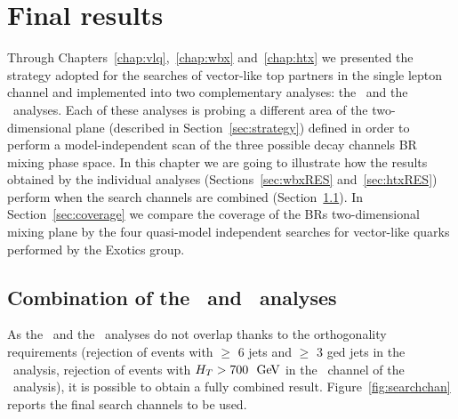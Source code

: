 \clearpage{\pagestyle{empty}\cleardoublepage}

\chapter{Final results}\label{chap:results}

Through Chapters~\ref{chap:vlq},~\ref{chap:wbx} and~\ref{chap:htx}
we presented the strategy adopted for the searches of vector-like
top partners in the single lepton channel and implemented into
two complementary analyses: the \wbx\ and the \htx\ analyses.
Each of these analyses is probing a different
area of the two-dimensional plane (described in Section~\ref{sec:strategy}) 
defined in order to perform
a model-independent scan of the three possible decay channels BR 
mixing phase space.
In this chapter we are going to illustrate how the results
obtained by the individual analyses (Sections~\ref{sec:wbxRES} 
and~\ref{sec:htxRES}) perform when the search channels are
combined (Section~\ref{sec:results_comb}).
In Section~\ref{sec:coverage} we compare
the coverage of the BRs two-dimensional
mixing plane by the four quasi-model independent
searches for vector-like quarks performed
by the Exotics group.


\section{Combination of the \wbx\ and \htx\ analyses}\label{sec:results_comb}

As the \wbx\ and the \htx\ analyses do not overlap
thanks to the orthogonality requirements (rejection of
events with $\geq$ 6 jets and $\geq$ 3 \btag ged jets
in the \wbx\ analysis, rejection of events with $H_T>700~\gev$
in the \chii\ channel of the \htx\ analysis), it is possible
to obtain a fully combined result. Figure~\ref{fig:searchchan}
reports the final search channels to be used.

